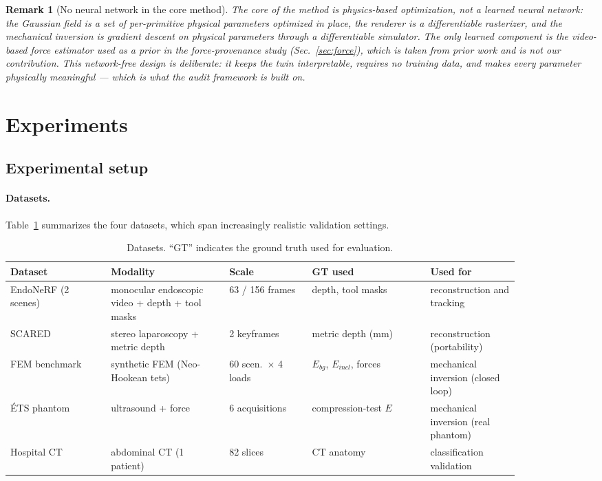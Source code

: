 \documentclass[review]{elsarticle}
\newtheorem{remark}{Remark}
\begin{document}
\begin{remark}[No neural network in the core method]
\label{rem:networkfree}
The core of the method is physics-based optimization, not a learned neural
network: the Gaussian field is a set of per-primitive physical parameters
optimized in place, the renderer is a differentiable rasterizer, and the
mechanical inversion is gradient descent on physical parameters through a
differentiable simulator. The only learned component is the video-based
force estimator used as a prior in the force-provenance study
(Sec.~\ref{sec:force}), which is taken from prior work
\citep{smallbowelforce} and is not our contribution. This network-free
design is deliberate: it keeps the twin interpretable, requires no training
data, and makes every parameter physically meaningful --- which is what the
audit framework is built on.
\end{remark}

\section{Experiments}
\label{sec:experiments}

\subsection{Experimental setup}
\label{sec:setup}

\paragraph{Datasets.}
Table~\ref{tab:datasets} summarizes the four datasets, which span
increasingly realistic validation settings.

\begin{table}[htbp]
\centering
\caption{Datasets. ``GT'' indicates the ground truth used for evaluation.}
\label{tab:datasets}
\small
\begin{tabular}{@{}p{0.17\linewidth}p{0.20\linewidth}p{0.14\linewidth}p{0.20\linewidth}p{0.15\linewidth}@{}}
\toprule
Dataset & Modality & Scale & GT used & Used for \\
\midrule
EndoNeRF (2 scenes) & monocular endoscopic video + depth + tool masks & 63 / 156 frames & depth, tool masks & reconstruction and tracking \\
SCARED & stereo laparoscopy + metric depth & 2 keyframes & metric depth (mm) & reconstruction (portability) \\
FEM benchmark & synthetic FEM (Neo-Hookean tets) & 60 scen.\ $\times$ 4 loads & $E_{bg}$, $E_{incl}$, forces & mechanical inversion (closed loop) \\
\'ETS phantom & ultrasound + force & 6 acquisitions & compression-test $E$ & mechanical inversion (real phantom) \\
Hospital CT & abdominal CT (1 patient) & 82 slices & CT anatomy & classification validation \\
\bottomrule
\end{tabular}
\end{table}
\end{document}
